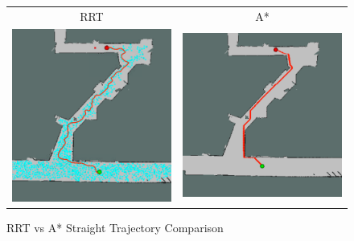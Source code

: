 \documentclass{article}
\begin{document}
\begin{figure}[h]
\begin{center}
\begin{tabular}{c|c}
    RRT & A* \\
    \includegraphics[scale=.5]{RRT-Gradescope.png} & 
    \includegraphics[scale=.5]{A_Star_Gradescope.png} & 
\end{tabular}
\caption{RRT vs A* Straight Trajectory Comparison}
\end{center}
\end{figure}
\\
\end{document}
